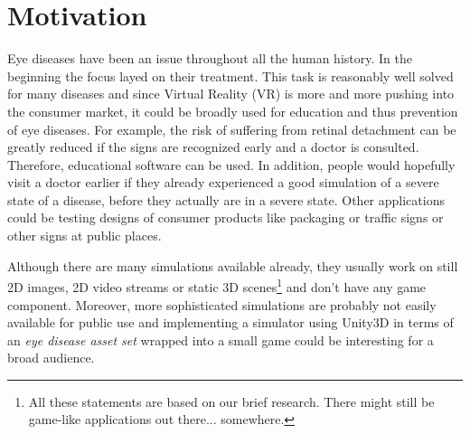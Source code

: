 \documentclass{acm_proc_article-sp}
\begin{document}
%

%
%
% 

\section{Motivation}
Eye diseases have been an issue throughout all the human history. In the
beginning the focus layed on their treatment. This task is reasonably well
solved for many diseases and since Virtual Reality (VR) is more and more
pushing into the consumer market, it could be broadly used for education and
thus prevention of eye diseases. For example, the risk of suffering from
retinal detachment can be greatly reduced if the signs are recognized early
and a doctor is consulted. Therefore, educational software can be used.
In addition, people would hopefully visit a doctor earlier if they already
experienced a good simulation of a severe state of a disease, before they
actually are in a severe state.
Other applications could be testing designs of consumer products like packaging
or traffic signs or other signs at public places.

Although there are many simulations available already, they usually work on
still 2D images, 2D video streams or static 3D scenes\footnote{All these
statements are based on our brief research. There might still be game-like
applications out there... somewhere.} and don't have any game component.
Moreover, more sophisticated simulations are probably not easily available
for public use and implementing a simulator using Unity3D in terms of an
\emph{eye disease asset set} wrapped into a small game could be interesting
for a broad audience.

\end{document}

